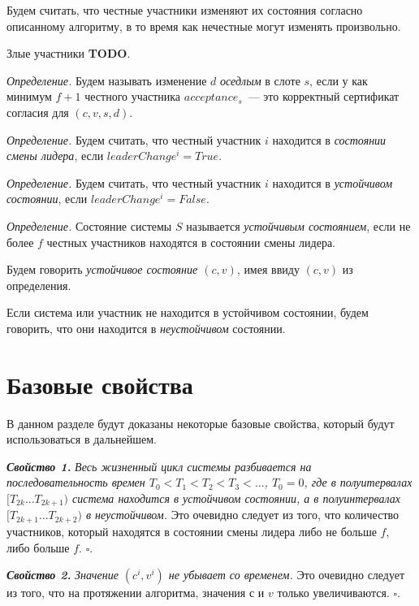 Будем считать, что честные участники изменяют их состояния согласно описанному алгоритму, в то время как нечестные могут изменять произвольно.

Злые участники \textbf{TODO}.

\textit{Определение.} Будем называть изменение $d$ \textit{оседлым} в слоте $s$, если у как минимум $f+1$ честного участника $acceptance_s$~--- это корректный сертификат согласия для $(c, v, s, d)$.

\textit{Определение.} Будем считать, что честный участник $i$ находится в \textit{состоянии смены лидера}, если $leaderChange^i = True$.

\textit{Определение.} Будем считать, что честный участник $i$ находится в \textit{устойчивом состоянии}, если $leaderChange^i = False$.

\textit{Определение.} Состояние системы $S$ называется \textit{устойчивым состоянием}, если не более $f$ честных участников находятся в состоянии смены лидера. 

Будем говорить \textit{устойчивое состояние $(c, v)$}, имея ввиду $(c, v)$ из определения.

Если система или участник не находится в устойчивом состоянии, будем говорить, что они находится в \textit{неустойчивом} состоянии.

\section{Базовые свойства}
В данном разделе будут доказаны некоторые базовые свойства, который будут использоваться в дальнейшем.

\textbf{\textit{Свойство 1.}} \textit{Весь жизненный цикл системы разбивается на последовательность времен
$T_0 < T_1 < T_2 < T_3 < ...$, $T_0=0$, где в полуитервалах $[T_{2k}...T_{2k+1})$ система находится в устойчивом состоянии, а в полуинтервалах $[T_{2k+1}...T_{2k+2})$ в неустойчивом.}
Это очевидно следует из того, что количество участников, который находятся в состоянии смены лидера либо не больше $f$, либо больше $f$. $\square$.
\vspace{10pt}

\textbf{\textit{Свойство 2.}} \textit{Значение $(c^i, v^i)$ не убывает со временем.}
Это очевидно следует из того, что на протяжении алгоритма, значения $с$ и $v$ только увеличиваются. $\square$.
\vspace{10pt}

